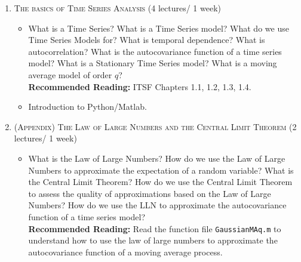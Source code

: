\documentclass[12pt]{article} %
\numberwithin{equation}{section}
\theoremstyle{definition}
\newcommand{\0}{\textbf{0}}                          %
\begin{document}
\begin{enumerate}
%
%
%


\item  {\scshape The basics of Time Series Analysis} (4 lectures/ 1 week)

\begin{itemize}

\item {What is a Time Series? What is a Time Series model? What do we use Time Series Models for? What is temporal dependence? What is autocorrelation? What is the autocovariance function of a time series model?} What is a Stationary Time Series model? What is a moving average model of order $q$? \\

\textbf{Recommended Reading:} ITSF Chapters 1.1, 1.2, 1.3, 1.4.\\

\item Introduction to Python/Matlab. 
   
\end{itemize}  

\item {\scshape (Appendix) The Law of Large Numbers and the Central Limit Theorem} (2 lectures/ 1 week)

\begin{itemize}

\item What is the Law of Large Numbers? How do we use the Law of Large Numbers to approximate the expectation of a random variable? What is the Central Limit Theorem? How do we use the Central Limit Theorem to assess the quality of approximations based on the Law of Large Numbers? How do we use the LLN to approximate the autocovariance function of a time series model?\\

\textbf{Recommended Reading:} Read the function file \texttt{GaussianMAq.m} to understand how to use the law of large numbers to approximate the autocovariance function of a moving average process.\\


\end{itemize}
\end{enumerate}
\end{document}

